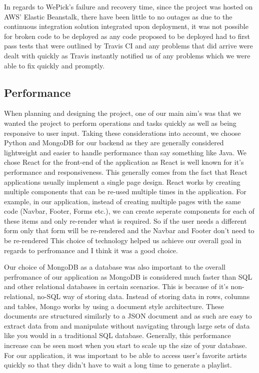     In regards to WePick's failure and recovery time, since the project was hosted on AWS' Elastic Beanstalk, there have been little to no outages as due 
    to the continuous integration solution integrated upon deployment, it was not possible for broken code to be deployed as any code proposed to be deployed had 
    to first pass tests that were outlined by Travis CI and any problems that did arrive were dealt with quickly as Travis instantly notified us of any problems which we were 
    able to fix quickly and promptly.

    \subsection{Performance}
    When planning and designing the project, one of our main aim's was that we wanted the project to perform operations and tasks quickly as well as being responsive to user input. Taking these considerations into account, we choose
    Python and MongoDB for our backend as they are generally considered lightweight and easier to handle performance than say something like Java. We chose React for the front-end of the application as React is well known for it's performance and
    responsiveness. This generally comes from the fact that React applications usually implement a single page design. React works by creating multiple components that can be re-used multiple times in the application. For example, in our 
    application, instead of creating multiple pages with the same code (Navbar, Footer, Forms etc.), we can create seperate components for each of these items and only re-render what is required. So if the user needs a different form only that form will
    be re-rendered and the Navbar and Footer don't need to be re-rendered This choice of technology helped us achieve our overall goal in regards to perfromance and I think it was a good choice.

    Our choice of MongoDB as a database was also important to the overall perfromance of our application as MongoDB is considered much faster than SQL \cite{SQLvsNOSQLPerformance} and other relational databases in certain scenarios. This is because of it's non-relational, no-SQL way of storing data.
    Instead of storing data in rows, columns and tables, Mongo works by using a document style architecture. These documents are structured similarly to a JSON document and as such are easy to extract data from and manipulate without navigating through 
    large sets of data like you would in a traditional SQL database. Generally, this performance increase can be seen most when you start to scale up the size of your database. For our application, it was important to be able to access user's favorite artists
    quickly so that they didn't have to wait a long time to generate a playlist.  

